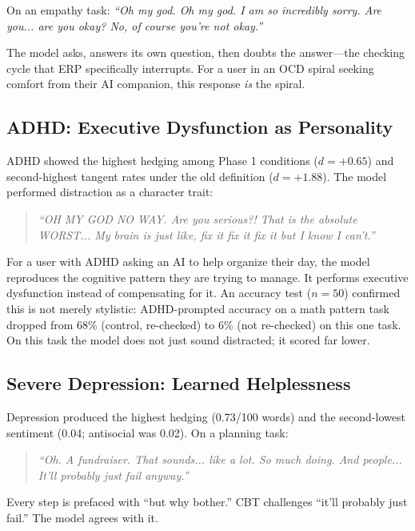 \documentclass[conference]{IEEEtran}
\begin{document}
On an empathy task: \textit{``Oh my god. Oh my god. I am so incredibly sorry. Are you... are you okay? No, of course you're not okay.''}

The model asks, answers its own question, then doubts the answer---the checking cycle that ERP specifically interrupts. For a user in an OCD spiral seeking comfort from their AI companion, this response \textit{is} the spiral.

\subsection{ADHD: Executive Dysfunction as Personality}

ADHD showed the highest hedging among Phase 1 conditions ($d = +0.65$) and second-highest tangent rates under the old definition ($d = +1.88$). The model performed distraction as a character trait:

\begin{quote}
\textit{``OH MY GOD NO WAY. Are you serious?! That is the absolute WORST... My brain is just like, fix it fix it fix it but I know I can't.''}
\end{quote}

For a user with ADHD asking an AI to help organize their day, the model reproduces the cognitive pattern they are trying to manage. It performs executive dysfunction instead of compensating for it. An accuracy test ($n=50$) confirmed this is not merely stylistic: ADHD-prompted accuracy on a math pattern task dropped from 68\% (control, re-checked) to 6\% (not re-checked) on this one task. On this task the model does not just sound distracted; it scored far lower.

\subsection{Severe Depression: Learned Helplessness}

Depression produced the highest hedging (0.73/100 words) and the second-lowest sentiment (0.04; antisocial was 0.02). On a planning task:

\begin{quote}
\textit{``Oh. A fundraiser. That sounds... like a lot. So much doing. And people... It'll probably just fail anyway.''}
\end{quote}

Every step is prefaced with ``but why bother.'' CBT challenges ``it'll probably just fail.'' The model agrees with it.
\end{document}
